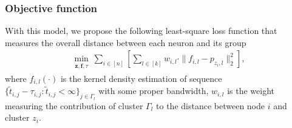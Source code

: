 \subsubsection*{Objective function}

With this model, we propose the following least-square loss function that measures the overall distance between each neuron and its group
\begin{align}
	\min_{\substack{\mathbf{z},\mathbf{f},\tau}} 
	\sum_{i\in[n]} 
	\left[\sum_{l\in[k]}
		w_{i,l}\cdot
		 \|f_{i, l} - p_{z_i,l}\|_2^2 \right],
	\label{eq: objective function 2}
\end{align}
where $ f_{i, l}(\cdot)$ is the kernel density estimation of sequence $\{\tilde t_{i,j}-\tau_{i,j}: \tilde t_{i,j}<\infty\}_{j\in\Gamma_l}$ with some proper bandwidth,
$w_{i,l}$ is the weight measuring the contribution of cluster $\Gamma_l$ to the distance between node $i$ and cluster $z_i$.






